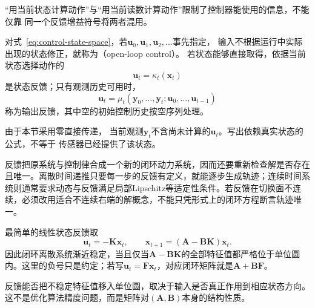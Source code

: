 “用当前状态计算动作”与“用当前读数计算动作”限制了控制器能使用的信息，不能仅靠
同一个反馈增益符号将两者混用。
\begin{definition}[开环控制与反馈控制]
\label{def:control-open-loop-state-output-feedback}
对式~\eqref{eq:control-state-space}，若$\bm{u}_0,\bm{u}_1,\bm{u}_2,\ldots$事先指定，
输入不根据运行中实际出现的状态修正，就称为（open-loop control）。
若状态能够直接取得，依据当前状态选择动作的
\[
  \bm{u}_t=\kappa_t(\bm{x}_t)
\]
是状态反馈；只有观测历史可用时，
\[
  \bm{u}_t
  =
  \mu_t(\bm{y}_0,\ldots,\bm{y}_t;
  \bm{u}_0,\ldots,\bm{u}_{t-1})
\]
称为输出反馈，其中空的初始控制历史按空序列处理。
\end{definition}
由于本节采用零直接传递，
当前观测$\bm{y}_t$不含尚未计算的$\bm{u}_t$。写出依赖真实状态的公式，不等于
传感器已经提供了该状态。

反馈把原系统与控制律合成一个新的闭环动力系统，因而还要重新检查解是否存在且唯一。离散时间递推只要每一步的反馈有定义，就能逐步生成轨迹；连续时间系统则通常要求动态与反馈满足局部Lipschitz等适定性条件。若反馈在切换面不连续，必须改用适合不连续右端的解概念，不能只凭形式上的闭环方程断言轨迹唯一。

最简单的线性状态反馈取
\begin{equation}
  \bm{u}_t=-\bm{K}\bm{x}_t,
  \qquad
  \bm{x}_{t+1}
  =(\bm{A}-\bm{B}\bm{K})\bm{x}_t.
  \label{eq:control-state-feedback}
\end{equation}
因此闭环离散系统渐近稳定，当且仅当$\bm{A}-\bm{B}\bm{K}$的全部特征值都严格位于单位圆内。这里的负号只是约定；若写$\bm{u}_t=\bm{F}\bm{x}_t$，对应闭环矩阵就是$\bm{A}+\bm{B}\bm{F}$。

反馈能否把不稳定特征值移入单位圆，取决于输入是否真正作用到相应状态方向。这不是优化算法精度问题，而是矩阵对$(\bm{A},\bm{B})$本身的结构性质。
